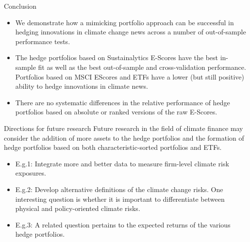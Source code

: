 \begin{frame}{Conclusion}
	\begin{itemize}
	\item We demonstrate how a mimicking portfolio approach can be successful in hedging innovations in climate change news across a number of out-of-sample performance tests. 
	\item The hedge portfolios based on Sustainalytics E-Scores have the best in-sample fit as well as the best out-of-sample and cross-validation performance. Portfolios based on MSCI EScores and ETFs have a lower (but still positive) ability to hedge innovations in climate news. 
	\item There are no systematic differences in the relative performance of hedge portfolios based on absolute or ranked versions of the raw E-Scores.
	\end{itemize}	
\end{frame}

\begin{frame}{Directions for future research}
	Future research in the field of climate finance may consider the addition of more assets to the hedge portfolios and the formation of hedge portfolios based on both characteristic-sorted portfolios and ETFs.
	\medskip

	\begin{itemize}
	\item E.g.1: Integrate more and better data to measure firm-level climate risk exposures.
	\item E.g.2: Develop alternative definitions of the climate change risks. One interesting question is whether it is important to differentiate between physical and policy-oriented climate risks.
	\item E.g.3: A related question pertains to the expected returns of the various hedge portfolios.
	\end{itemize}
\end{frame}

